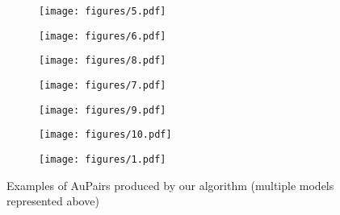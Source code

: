 \documentclass[11pt, a4paper, logo, copyright]{googledeepmind}
\def\aupairs/{\textcolor{golden}{Au}Pairs}
\begin{document}
\begin{figure}[ht]\ContinuedFloat
    \centering
    \begin{subfigure}{\linewidth}
    \texttt{[image: figures/5.pdf]}
    \end{subfigure}
    \medskip
    
    \begin{subfigure}{\linewidth}
    \texttt{[image: figures/6.pdf]}
    \end{subfigure}
    \medskip
    
    \begin{subfigure}{\linewidth}
    \texttt{[image: figures/8.pdf]}
    \end{subfigure}
    \medskip
    
\end{figure}

\begin{figure}[ht]\ContinuedFloat
    \centering
    \begin{subfigure}{\linewidth}
    \texttt{[image: figures/7.pdf]}
    \end{subfigure}
    \medskip

    \begin{subfigure}{\linewidth}
    \texttt{[image: figures/9.pdf]}
    \end{subfigure}
    \medskip
    
    \begin{subfigure}{\linewidth}
    \texttt{[image: figures/10.pdf]}
    \end{subfigure}
    \medskip
    
\end{figure}

\begin{figure}[ht]\ContinuedFloat
    \centering
    \begin{subfigure}{\linewidth}
    \texttt{[image: figures/1.pdf]}
    \end{subfigure}
    \medskip
    \caption{Examples of \aupairs/ produced by our algorithm (multiple models represented above)}
    \label{vis:aupairs}
\end{figure}
\end{document}
